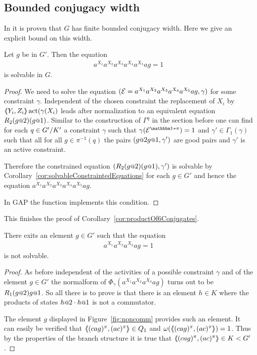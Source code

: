 \documentclass[a4paper,11pt]{amsart}
\begin{document}
\subsection{Bounded conjugacy width}
In \cite{Fink:Conjugacy_growth} it is proven that $G$ has finite bounded conjugacy width. Here we give an explicit bound 
on this width.
\begin{pro}
 Let $g$ be in $G'$. Then the equation 
 \begin{align*}
  a^{X_1}a^{X_2}a^{X_3}a^{X_4}a^{X_5}ag=1
 \end{align*}
is solvable in $G$. 
\end{pro}
\begin{proof}
We need to solve the equation $(\mathcal{E}=a^{X_1}a^{X_2}a^{X_3}a^{X_4}a^{X_5}ag,\gamma)$ for
some constraint $\gamma$. Independent of the chosen constraint the replacement of
$X_i$ by $\langle\negthickspace\langle Y_i,Z_i\rangle\negthickspace\rangle\operatorname{act}(\gamma(X_i)$ leads after normalization to an equivalent equation 
$R_2(g\at{2})(g\at{1})$. Similar to the construction of $\Gamma^q$ in the section
before one can find for each $q\in{G'/K'}$ a constraint $\gamma$ such that
$\gamma(\eq{E}^{\id*\pi})=1$ and $\gamma'\in\Gamma_1(\gamma)$ such that all for all 
$g\in\pi^{-1}(q)$ the pairs $(g\at{2}g\at{1},\gamma')$ are good pairs and $\gamma'$ is 
an active constraint.

Therefore the constrained equation $(R_2(g\at{2})(g\at{1}),\gamma')$ is solvable
by Corollary~\ref{cor:solvableConstraintedEquations}
for each $g\in G'$ and hence the equation $a^{X_1}a^{X_2}a^{X_3}a^{X_4}a^{X_5}ag$.

In GAP the function  implements 
this condition.
\end{proof}	
This finishes the proof of Corollary~\ref{cor:productOf6Conjugates}.
\begin{lem}
 There exits an element $g\in G'$ such that the equation 
 \begin{align*}
  a^{X_1}a^{X_2}a^{X_3}ag=1
 \end{align*}
 is not solvable.
\end{lem}
\begin{proof}
As before independent of the activities of a possible constraint $\gamma$ and of the element $g\in G'$
the normalform of $\Phi_\gamma(a^{X_1}a^{X_2}a^{X_3}ag)$ turns out to
be $R_1(g\at{2}) g\at{1}$. So all there is to prove is that there is an element $h\in K$
where the products of states $h\at{2}\cdot h\at{1}$ is not a commutator.

The element $g$ displayed in Figure~\ref{fig:noncomm} provides such an element. It can easily be verified 
that $\langle\negthickspace\langle(cag)^\pi,(ac)^\pi\rangle\negthickspace\rangle\in Q_1$ and $\omega(\langle\negthickspace\langle(cag)^\pi,(ac)^\pi\rangle\negthickspace\rangle)=1$. Thus by
the properties of the branch structure it is true that $\langle\negthickspace\langle(cag)^\pi,(ac)^\pi\rangle\negthickspace\rangle\in K<G'$. 
\end{proof}
\end{document}
